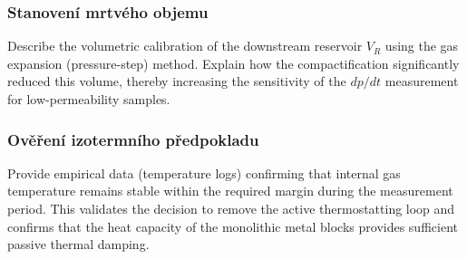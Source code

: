 \subsubsection{Stanovení mrtvého objemu}\label{sss:mrtvy_objem}
Describe the volumetric calibration of the downstream reservoir $V_{R}$ using the gas expansion (pressure-step) method. Explain how the compactification significantly reduced this volume, thereby increasing the sensitivity of the $dp/dt$ measurement for low-permeability samples.

\subsubsection{Ověření izotermního předpokladu}\label{sss:overeni_izotermnosti}
Provide empirical data (temperature logs) confirming that internal gas temperature remains stable within the required margin during the measurement period. This validates the decision to remove the active thermostatting loop and confirms that the heat capacity of the monolithic metal blocks provides sufficient passive thermal damping.